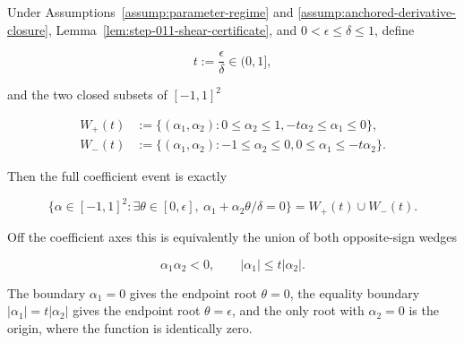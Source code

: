 \begin{lemma}
\label{lem:step-011-root-wedges}

Under Assumptions~\ref{assump:parameter-regime} and \ref{assump:anchored-derivative-closure},
Lemma~\ref{lem:step-011-shear-certificate}, and \(0<\epsilon\leq\delta\leq1\), define

\begin{equation}
\label{eq:appendix-display-353}
t:=\frac\epsilon\delta\in(0,1],
\end{equation}

and the two closed subsets of \([-1,1]^2\)

\begin{equation}
\label{eq:appendix-display-354}
\begin{aligned}
W_+(t)
&:=\{(\alpha_1,\alpha_2):0\leq\alpha_2\leq1,
-t\alpha_2\leq\alpha_1\leq0\},\\
W_-(t)
&:=\{(\alpha_1,\alpha_2):-1\leq\alpha_2\leq0,
0\leq\alpha_1\leq-t\alpha_2\}.
\end{aligned}
\end{equation}

Then the full coefficient event is exactly

\begin{equation}
\label{eq:appendix-display-355}
\{\alpha\in[-1,1]^2:\exists\theta\in[0,\epsilon],
\ \alpha_1+\alpha_2\theta/\delta=0\}
=W_+(t)\cup W_-(t).
\end{equation}

Off the coefficient axes this is equivalently the union of both opposite-sign wedges

\begin{equation}
\label{eq:appendix-display-356}
\alpha_1\alpha_2<0,
\qquad
\lvert\alpha_1\rvert\leq t\lvert\alpha_2\rvert.
\end{equation}

The boundary \(\alpha_1=0\) gives the endpoint root \(\theta=0\), the equality boundary
\(\lvert\alpha_1\rvert=t\lvert\alpha_2\rvert\) gives the endpoint root \(\theta=\epsilon\), and the only root
with \(\alpha_2=0\) is the origin, where the function is identically zero.


\end{lemma}

